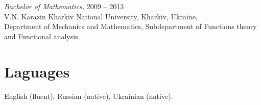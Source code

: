 \documentclass[margin, 10pt]{res} %
\begin{document}
\begin{resume}
{\sl Bachelor of Mathematics,} \hfill 2009 -- 2013\\ 
V.N. Karazin Kharkiv National University, Kharkiv, Ukraine,\\
Department of Mechanics and Mathematics, Subdepartment 
of Functions theory and Functional analysis.

\section{Laguages}
English (fluent), Russian (native), Ukrainian (native).

\end{resume}
\end{document}
